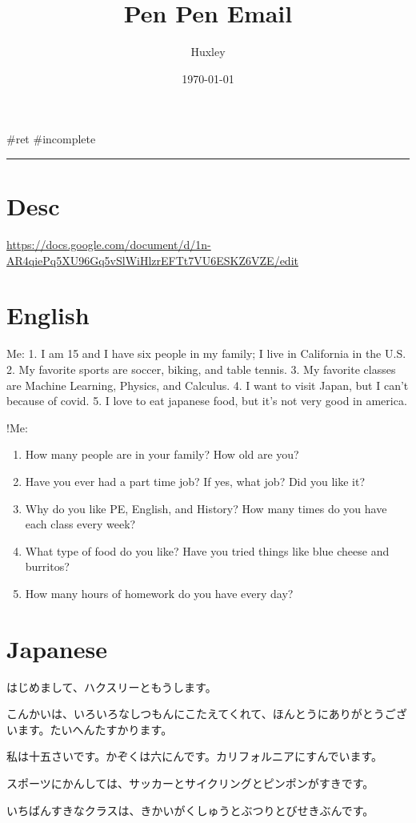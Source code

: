 \documentclass[letterpaper]{article}
\author{Huxley}
\date{\today}
\title{Pen Pen Email}
\renewcommand{\tableofcontents}{}
\begin{document}
\tableofcontents

\#ret \#incomplete

\noindent\rule{\textwidth}{0.5pt}

\section{Desc}
\label{sec:org80e6451}
\url{https://docs.google.com/document/d/1n-AR4qiePq5XU96Gq5vSlWiHlzrEFTt7VU6ESKZ6VZE/edit}

\section{English}
\label{sec:org8ecee08}
Me: 1. I am 15 and I have six people in my family; I live in California
in the U.S. 2. My favorite sports are soccer, biking, and table
tennis. 3. My favorite classes are Machine Learning, Physics, and
Calculus. 4. I want to visit Japan, but I can't because of covid. 5. I
love to eat japanese food, but it's not very good in america.

!Me:

\begin{enumerate}
\item How many people are in your family? How old are you?
\item Have you ever had a part time job? If yes, what job? Did you like it?
\item Why do you like PE, English, and History? How many times do you have
each class every week?
\item What type of food do you like? Have you tried things like blue cheese
and burritos?
\item How many hours of homework do you have every day?
\end{enumerate}

\section{Japanese}
\label{sec:orgc091c65}
はじめまして、ハクスリーともうします。

こんかいは、いろいろなしつもんにこたえてくれて、ほんとうにありがとうございます。たいへんたすかります。

私は十五さいです。かぞくは六にんです。カリフォルニアにすんでいます。

スポーツにかんしては、サッカーとサイクリングとピンポンがすきです。

いちばんすきなクラスは、きかいがくしゅうとぶつりとびせきぶんです。
\end{document}

